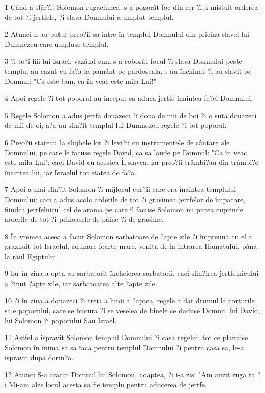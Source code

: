 \par 1 Când a sfâr?it Solomon rugaciunea, s-a pogorât foc din cer ?i a mistuit arderea de tot ?i jertfele, ?i slava Domnului a umplut templul.
\par 2 Atunci n-au putut preo?ii sa intre în templul Domnului din pricina slavei lui Dumnezeu care umpluse templul.
\par 3 ?i to?i fiii lui Israel, vazând cum s-a coborât focul ?i slava Domnului peste templu, au cazut cu fa?a la pamânt pe pardoseala, s-au închinat ?i au slavit pe Domnul: "Ca este bun, ca în veac este mila Lui!"
\par 4 Apoi regele ?i tot poporul au început sa aduca jertfe înaintea fe?ei Domnului.
\par 5 Regele Solomon a adus jertfa douazeci ?i doua de mii de boi ?i o suta douazeci de mii de oi; a?a au sfin?it templul lui Dumnezeu regele ?i tot poporul.
\par 6 Preo?ii stateau la slujbele lor ?i levi?ii cu instrumentele de cântare ale Domnului, pe care le facuse regele David, ca sa laude pe Domnul: "Ca în veac este mila Lui"; caci David cu acestea Îl slavea, iar preo?ii trâmbi?au din trâmbi?e înaintea lui, iar Israelul tot statea de fa?a.
\par 7 Apoi a mai sfin?it Solomon ?i mijlocul cur?ii care era înaintea templului Domnului; caci a adus acolo arderile de tot ?i grasimea jertfelor de împacare, fiindca jertfelnicul cel de arama pe care îl facuse Solomon nu putea cuprinde arderile de tot ?i prinoasele de pâine ?i de grasime.
\par 8 În vremea aceea a facut Solomon sarbatoare de ?apte zile ?i împreuna cu el a praznuit tot Israelul, adunare foarte mare, venita de la intrarea Hamatului, pâna la râul Egiptului.
\par 9 Iar în ziua a opta au sarbatorit încheierea sarbatorii, caci sfin?irea jertfelnicului a ?inut ?apte zile, iar sarbatoarea alte ?apte zile.
\par 10 ?i în ziua a douazeci ?i treia a lunii a ?aptea, regele a dat drumul la corturile sale poporului, care se bucura ?i se veselea de binele ce daduse Domnul lui David, lui Solomon ?i poporului Sau Israel.
\par 11 Astfel a ispravit Solomon templul Domnului ?i casa regelui; tot ce planuise Solomon în inima sa sa faca pentru templul Domnului ?i pentru casa sa, le-a ispravit dupa dorin?a.
\par 12 Atunci S-a aratat Domnul lui Solomon, noaptea, ?i i-a zis: "Am auzit ruga ta ?i Mi-am ales locul acesta sa fie templu pentru aducerea de jertfe.

